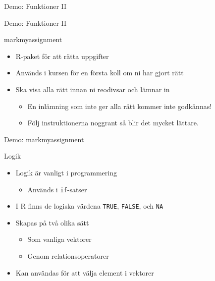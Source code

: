 \documentclass[
  10pt,
  ignorenonframetext,
]{beamer}
\providecommand{\tightlist}{%
  \setlength{\itemsep}{0pt}\setlength{\parskip}{0pt}}
\begin{document}
\begin{frame}{Demo: Funktioner II}
\protect\hypertarget{demo-funktioner-ii}{}
\begin{block}{Demo: Funktioner II}
\protect\hypertarget{demo-funktioner-ii-1}{}
\end{block}
\end{frame}

\begin{frame}{markmyassignment}
\protect\hypertarget{markmyassignment}{}
\begin{itemize}
\tightlist
\item
  R-paket för att rätta uppgifter
\item
  Används i kursen för en första koll om ni har gjort rätt
\item
  Ska visa alla rätt innan ni reodivsar och lämnar in

  \begin{itemize}
  \tightlist
  \item
    En inlämning som inte ger alla rätt kommer inte godkännas!
  \item
    Följ instruktionerna noggrant så blir det mycket lättare.
  \end{itemize}
\end{itemize}

\begin{block}{Demo: markmyassignment}
\protect\hypertarget{demo-markmyassignment}{}
\end{block}
\end{frame}

\begin{frame}{Logik}
\protect\hypertarget{logik}{}
\begin{itemize}
\tightlist
\item
  Logik är vanligt i programmering

  \begin{itemize}
  \tightlist
  \item
    Används i \texttt{if}-satser
  \end{itemize}
\item
  I R finns de logiska värdena \texttt{TRUE}, \texttt{FALSE}, och
  \texttt{NA}
\item
  Skapas på två olika sätt

  \begin{itemize}
  \tightlist
  \item
    Som vanliga vektorer
  \item
    Genom relationsoperatorer
  \end{itemize}
\item
  Kan användas för att välja element i vektorer
\end{itemize}
\end{frame}
\end{document}

